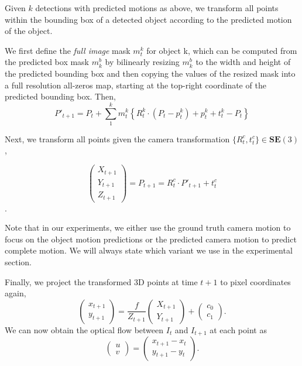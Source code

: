 Given $k$ detections with predicted motions as above, we transform all points within the bounding
box of a detected object according to the predicted motion of the object.

We first define the \emph{full image} mask $m_t^k$ for object k,
which can be computed from the predicted box mask $m_k^b$ by bilinearly resizing
$m_k^b$ to the width and height of the predicted bounding box and then copying the values
of the resized mask into a full resolution all-zeros map, starting at the top-right coordinate of the predicted bounding box.
Then,
\begin{equation}
P'_{t+1} =
P_t + \sum_1^{k} m_t^k\left\{ R_t^k \cdot (P_t - p_t^k) + p_t^k + t_t^k - P_t \right\}
\end{equation}

Next, we transform all points given the camera transformation $\{R_t^c, t_t^c\} \in \mathbf{SE}(3)$, %

\begin{equation}
\begin{pmatrix}
X_{t+1} \\ Y_{t+1} \\ Z_{t+1}
\end{pmatrix}
= P_{t+1} = R_t^c \cdot P'_{t+1} + t_t^c
\end{equation}.

Note that in our experiments, we either use the ground truth camera motion to focus
on the object motion predictions or the predicted camera motion to predict complete
motion. We will always state which variant we use in the experimental section.

Finally, we project the transformed 3D points at time $t+1$ to pixel coordinates again,
\begin{equation}
\begin{pmatrix}
x_{t+1} \\ y_{t+1}
\end{pmatrix}
=
\frac{f}{Z_{t+1}}
\begin{pmatrix}
X_{t+1} \\ Y_{t+1}
\end{pmatrix}
+
\begin{pmatrix}
c_0 \\ c_1
\end{pmatrix}.
\end{equation}
We can now obtain the optical flow between $I_t$ and $I_{t+1}$ at each point as
\begin{equation}
\begin{pmatrix}
u \\ v
\end{pmatrix}
=
\begin{pmatrix}
x_{t+1} - x_{t} \\ y_{t+1} - y_{t}
\end{pmatrix}.
\end{equation}
